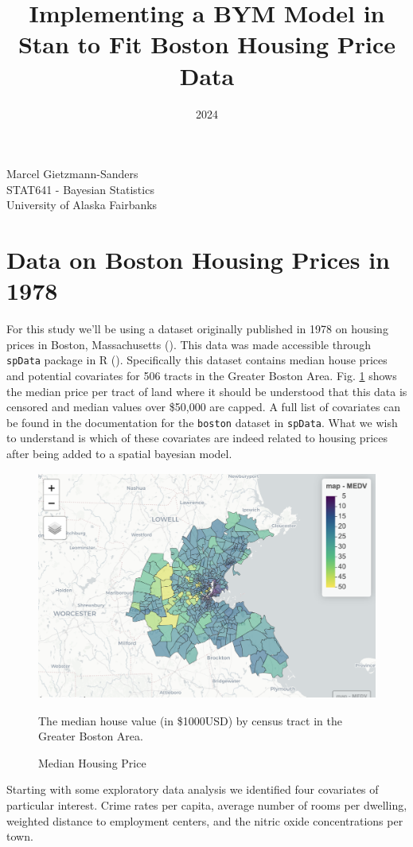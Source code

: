 \documentclass[11pt]{article}
\title{Implementing a BYM Model in Stan to Fit Boston Housing Price Data}
\date{2024}
\makeatletter
\newcommand{\code}[1]{\colorbox{light-gray}{\texttt{#1}}}
\renewcommand{\maketitle}{
\begin{center}

\pagestyle{empty}

{\Large \bf \@title\par}
\vspace{1cm}

{\LARGE Marcel Gietzmann-Sanders}\\[1cm]

STAT641 - Bayesian Statistics \\
University of Alaska Fairbanks


\end{center}
}\makeatother
\makeatother
\begin{document}
\maketitle

\section{Data on Boston Housing Prices in 1978}

For this study we'll be using a dataset originally published in 1978 on housing prices in Boston, Massachusetts (\cite{origin}). This data was made accessible through \code{spData} package in R (\cite{spdata}). Specifically this dataset contains median house prices and potential covariates for 506 tracts in the Greater Boston Area. Fig. \ref{fig:prices} shows the median price per tract of land where it should be understood that this data is censored and median values over \$50,000 are capped. A full list of covariates can be found in the documentation for the \code{boston} dataset in \code{spData}. What we wish to understand is which of these covariates are indeed related to housing prices after being added to a spatial bayesian model. \newline

\begin{figure}[h!] 
  \centering
  \includegraphics[height=75mm]{prices.png}
  \caption{Median Housing Price}
  \medskip
	\small
	The median house value (in \$1000USD) by census tract in the Greater Boston Area.
  \label{fig:prices}
\end{figure}

Starting with some exploratory data analysis we identified four covariates of particular interest. Crime rates per capita, average number of rooms per dwelling, weighted distance to employment centers, and the nitric oxide concentrations per town. 
\end{document}
